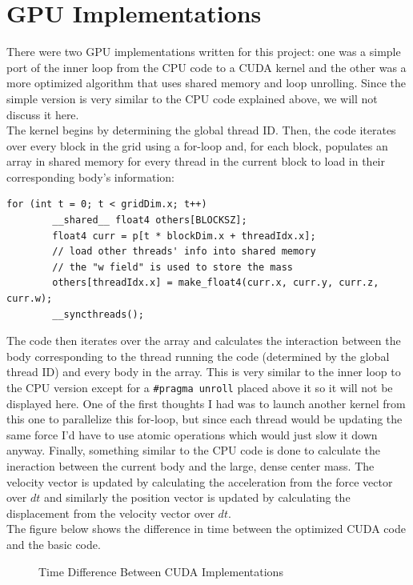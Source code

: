 \section{GPU Implementations}
There were two GPU implementations written for this project: one was a simple port of the inner loop from the CPU code to a CUDA kernel and the other was a more optimized
algorithm that uses shared memory and loop unrolling. Since the simple version is very similar to the CPU code explained above, we will not discuss it here. \\
\indent The kernel begins by determining the global thread ID. Then, the code iterates over every block in the grid using a for-loop and, for each block, populates an array in shared memory for every thread in the current block to load in their corresponding body's information:
\begin{lstlisting}[style = cudastyle]
    for (int t = 0; t < gridDim.x; t++)
        __shared__ float4 others[BLOCKSZ];
        float4 curr = p[t * blockDim.x + threadIdx.x];
        // load other threads' info into shared memory
        // the "w field" is used to store the mass
        others[threadIdx.x] = make_float4(curr.x, curr.y, curr.z, curr.w);
        __syncthreads();
\end{lstlisting}
The code then iterates over the array and calculates the interaction between the body corresponding to the thread running the code (determined by the global thread ID) and every body in the array. This is very similar to the inner loop to the CPU version except for a \verb|#pragma unroll| placed above it so it will not be displayed here. One of the first thoughts I had was to launch another kernel from this one to parallelize this for-loop, but since each thread would be updating the same force I'd have to use atomic operations which would just slow it down anyway. Finally, something similar to the CPU code is done to calculate the ineraction between the current body and the large, dense center mass. The velocity vector is updated by calculating the acceleration from the force vector over $dt$ and similarly the position vector is updated by calculating the displacement from the velocity vector over $dt$.\\
\indent The figure below shows the difference in time between the optimized CUDA code and the basic code.
\begin{figure}[H]
    \centering
    \caption{Time Difference Between CUDA Implementations}
    \label{fig:cuda time}
\end{figure}
